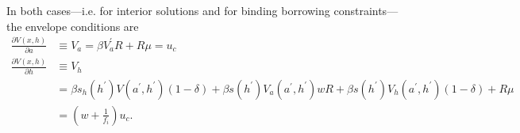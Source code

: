 \documentclass[a4paper,12pt]{article}%
\begin{document}
In both cases---i.e. for interior solutions and for binding borrowing constraints---the envelope conditions are
\begin{align*}
\frac{\partial V\left(  x,h\right)  }{\partial a}  &  \equiv V_{a}=\beta V_{a}^{\prime}R+R\mu=u_{c}\\
\frac{\partial V\left(  x,h\right)  }{\partial h}  &  \equiv V_{h}\\
&  =\beta s_{h}\left(  h^{\prime}\right)  V(a^{\prime},h^{\prime})\left(1-\delta\right)  +\beta s\left(  h^{\prime}\right)  V_{a}(a^{\prime},h^{\prime})wR+\beta s\left(  h^{\prime}\right)  V_{h}(a^{\prime},h^{\prime})\left(  1-\delta\right)  +R\mu \\
&  =\left(  w+\frac{1}{f_{i}}\right) u_{c}.
\end{align*}
\newpage


\end{document}
